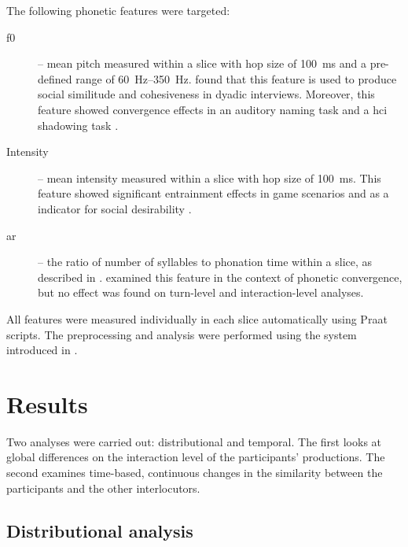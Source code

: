 The following phonetic features were targeted: 
%
\begin{description}%
	\item[\Acf{f0}] -- mean pitch measured within a slice with hop size of \SI{100}{\milli\second} and a pre-defined range of \SIrange{60}{350}{\hertz}.
	\citet{Gregory1993Voice} found that this feature is used to produce social similitude and cohesiveness in dyadic interviews.
	Moreover, this feature showed convergence effects in an auditory naming task \citep{Babel2012role} and a \ac{hci} shadowing task \citep{Bulatov2009effect}.
	
	\item[Intensity] -- mean intensity measured within a slice with hop size of \SI{100}{\milli\second}.
	This feature showed significant entrainment effects in game scenarios \citep{Levitan2011measuring} and as a indicator for social desirability \citep{Natale1975convergence}.
	
	\item[\Acf{ar}] -- the ratio of number of syllables to phonation time within a slice, as described in \citet{DeJong2009arcitulcationrate}.
	\citet{Schweitzer2013convergence} examined this feature in the context of phonetic convergence, but no effect was found on turn-level and interaction-level analyses.
\end{description}
%
All features were measured individually in each slice automatically using Praat \citep{Boersma2018praat} scripts.
The preprocessing and analysis were performed using the system introduced in \citet[][and see \cref{chap:web-based_responsive_spoken_dialogue_system}]{Raveh2018Specom}.

\section{Results}
\label{sec:results_hhci}

Two analyses were carried out: distributional and temporal.
The first looks at global differences on the interaction level of the participants' productions.
The second examines time-based, continuous changes in the similarity between the participants and the other interlocutors.

\subsection{Distributional analysis}
\label{subsec:distributional_analysis}


